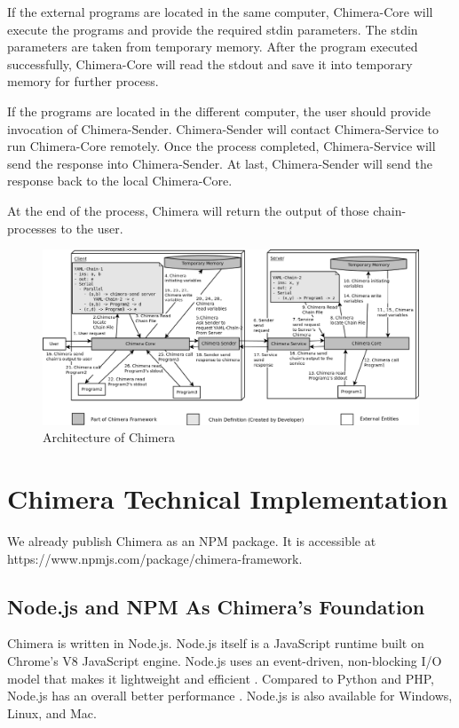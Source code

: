 \documentclass[conference]{IEEEtran}
\begin{document}
If the external programs are located in the same computer, Chimera-Core will execute the
programs and provide the required stdin parameters. The stdin parameters are taken from
temporary memory. After the program executed successfully, Chimera-Core will read the 
stdout and save it into temporary memory for further process.

If the programs are located in the different computer, the user should provide
invocation of Chimera-Sender. Chimera-Sender will contact Chimera-Service to run 
Chimera-Core remotely. Once the process completed, Chimera-Service will send the
response into Chimera-Sender. At last, Chimera-Sender will send the response back to
the local Chimera-Core.

At the end of the process, Chimera will return the output of those chain-processes to 
the user.

\begin{figure}
	\centering
	\includegraphics[width=1.0\textwidth]
		{images/chimera.png}
	\caption{Architecture of Chimera}
	\label{fig:chimeraArchitecture}
\end{figure}

\section{Chimera Technical Implementation}

We already publish Chimera as an NPM package. It is accessible at 
https://www.npmjs.com/package/chimera-framework.


\subsection{Node.js and NPM As Chimera's Foundation}

Chimera is written in Node.js. Node.js itself is a JavaScript runtime built on Chrome's 
V8 JavaScript engine. Node.js uses an event-driven, non-blocking I/O model that makes it 
lightweight and efficient \cite{nodejs}. Compared to Python and PHP, Node.js has an 
overall better performance \cite{lei2014performance}. Node.js is also available for
Windows, Linux, and Mac.
\end{document}
